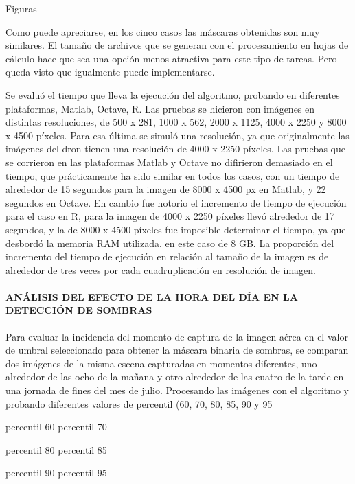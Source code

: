 Figuras

Como puede apreciarse, en los cinco casos las máscaras obtenidas son muy similares. El tamaño de archivos que se generan con el procesamiento en hojas de cálculo hace que sea una opción menos atractiva para este tipo de tareas. Pero queda visto que igualmente puede implementarse.

Se evaluó el tiempo que lleva la ejecución del algoritmo, probando en diferentes plataformas, Matlab, Octave, R. Las pruebas se hicieron con imágenes en distintas resoluciones, de 500 x 281, 1000 x 562, 2000 x 1125, 4000 x 2250 y 8000 x 4500 píxeles. Para esa última se simuló una resolución, ya que originalmente las imágenes del dron tienen una resolución de 4000 x 2250 píxeles. Las pruebas que se corrieron en las plataformas Matlab y Octave no difirieron demasiado en el tiempo, que prácticamente ha sido similar en todos los casos, con un tiempo de alrededor de 15 segundos para la imagen de 8000 x 4500 px en Matlab, y 22 segundos en Octave. En cambio fue notorio el incremento de tiempo de ejecución para el caso en R, para la imagen de 4000 x 2250 píxeles llevó alrededor de 17 segundos, y la de 8000 x 4500 píxeles fue imposible determinar el tiempo, ya que desbordó la memoria RAM utilizada, en este caso de 8 GB. La proporción del incremento del tiempo de ejecución en relación al tamaño de la imagen es de alrededor de tres veces por cada cuadruplicación en resolución de imagen.


\paragraph{ANÁLISIS DEL EFECTO DE LA HORA DEL DÍA EN LA DETECCIÓN DE SOMBRAS}
Para evaluar la incidencia del momento de captura de la imagen aérea en el valor de umbral seleccionado para obtener la máscara binaria de sombras, se comparan dos imágenes de la misma escena capturadas en momentos diferentes, uno alrededor de las ocho de la mañana y otro alrededor de las cuatro de la tarde en una jornada de fines del mes de julio. Procesando las imágenes con el algoritmo y probando diferentes valores de percentil (60, 70, 80, 85, 90 y 95 %



percentil 60	percentil 70



percentil 80	percentil 85



percentil 90	percentil 95



